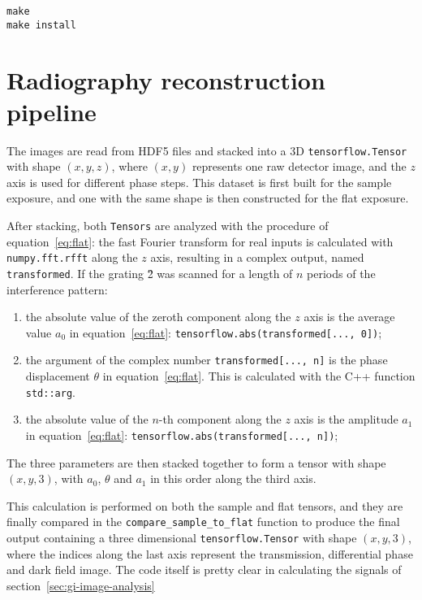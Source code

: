 \begin{lstlisting}
make
make install
\end{lstlisting}

\section{Radiography reconstruction pipeline}
The images are read from HDF5 files and stacked into a 3D
\texttt{tensorflow.Tensor} with shape $(x, y, z)$, where $(x, y)$
represents one raw detector image, and the $z$ axis is used for different
phase steps. This dataset is first built for the sample exposure, and one
with the same shape is then constructed for the flat exposure.

After stacking, both \texttt{Tensors} are analyzed with the procedure of
equation~\eqref{eq:flat}: the fast Fourier transform for real inputs is
calculated with \texttt{numpy.fft.rfft} along the $z$ axis, resulting in a
complex output, named \texttt{transformed}. If the grating \G2 was scanned
for a length of $n$ periods of the interference pattern:

\begin{enumerate}
    \item the absolute value of the zeroth component along the $z$ axis is the average value $a_0$
        in equation~\eqref{eq:flat}:
        \texttt{tensorflow.abs(transformed[..., 0])};
    \item the argument of the complex number \texttt{transformed[..., n]}
        is the phase displacement $\theta$ in equation~\eqref{eq:flat}. This
        is calculated with the C++ function \texttt{std::arg}.
    \item the absolute value of the $n$-th component along the $z$ axis is
        the amplitude $a_1$
        in equation~\eqref{eq:flat}:
        \texttt{tensorflow.abs(transformed[..., n])};
\end{enumerate}
The three parameters are then stacked together to form a tensor with shape
$(x, y, 3)$, with $a_0$, $\theta$ and $a_1$ in this order along the third axis.

This calculation is performed on both the sample and flat tensors, and they
are finally compared in the \texttt{compare\_sample\_to\_flat} function to
produce the final output containing a three dimensional
\texttt{tensorflow.Tensor} with shape $(x, y, 3)$, where the indices along
the last axis represent the transmission, differential phase and dark field
image. The code itself is pretty clear in calculating the signals of
section~\ref{sec:gi-image-analysis}

